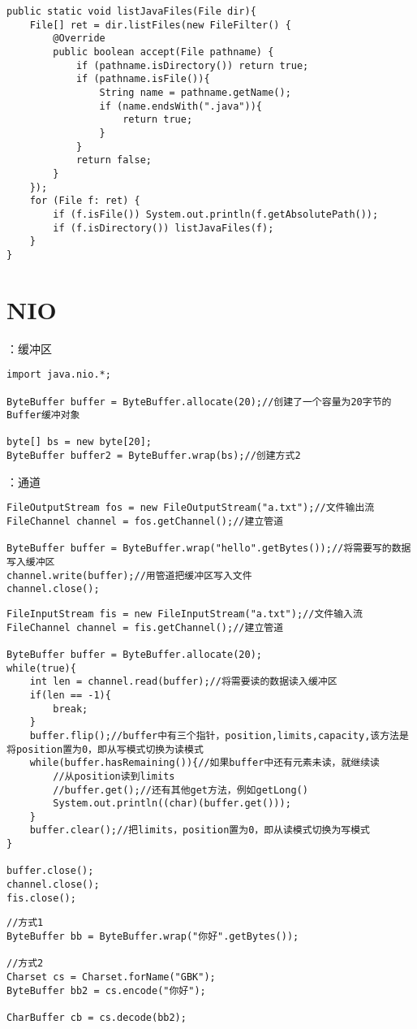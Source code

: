 \documentclass[a4paper]{report}
\begin{document}
\begin{lstlisting}[title=列出目录所有的.java文件]
public static void listJavaFiles(File dir){
    File[] ret = dir.listFiles(new FileFilter() {
        @Override
        public boolean accept(File pathname) {
            if (pathname.isDirectory()) return true;
            if (pathname.isFile()){
                String name = pathname.getName();
                if (name.endsWith(".java")){
                    return true;
                }
            }
            return false;
        }
    });
    for (File f: ret) {
        if (f.isFile()) System.out.println(f.getAbsolutePath());
        if (f.isDirectory()) listJavaFiles(f);
    }
}
\end{lstlisting}
\chapter{NIO}
：缓冲区
\begin{lstlisting}
import java.nio.*;

ByteBuffer buffer = ByteBuffer.allocate(20);//创建了一个容量为20字节的Buffer缓冲对象

byte[] bs = new byte[20];
ByteBuffer buffer2 = ByteBuffer.wrap(bs);//创建方式2
\end{lstlisting}
：通道
\begin{lstlisting}[title=写数据]
FileOutputStream fos = new FileOutputStream("a.txt");//文件输出流
FileChannel channel = fos.getChannel();//建立管道

ByteBuffer buffer = ByteBuffer.wrap("hello".getBytes());//将需要写的数据写入缓冲区
channel.write(buffer);//用管道把缓冲区写入文件
channel.close();
\end{lstlisting}

\begin{lstlisting}[title=读数据]
FileInputStream fis = new FileInputStream("a.txt");//文件输入流
FileChannel channel = fis.getChannel();//建立管道

ByteBuffer buffer = ByteBuffer.allocate(20);
while(true){
    int len = channel.read(buffer);//将需要读的数据读入缓冲区
    if(len == -1){
        break;
    }
    buffer.flip();//buffer中有三个指针，position,limits,capacity,该方法是将position置为0，即从写模式切换为读模式
    while(buffer.hasRemaining()){//如果buffer中还有元素未读，就继续读
        //从position读到limits
        //buffer.get();//还有其他get方法，例如getLong()
        System.out.println((char)(buffer.get()));
    }
    buffer.clear();//把limits，position置为0，即从读模式切换为写模式
}

buffer.close();
channel.close();
fis.close();
\end{lstlisting}
\begin{lstlisting}[title=字节流转字符流]
//方式1
ByteBuffer bb = ByteBuffer.wrap("你好".getBytes());

//方式2
Charset cs = Charset.forName("GBK");
ByteBuffer bb2 = cs.encode("你好");

CharBuffer cb = cs.decode(bb2);
\end{lstlisting}
\end{document}
